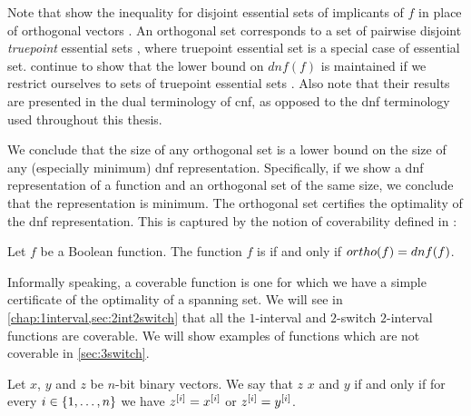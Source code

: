 Note that \citeauthor{Cepek2012}
show the inequality
for disjoint essential sets of implicants of $f$
in place of orthogonal vectors
\citep[Theorem 2.8]{Cepek2012}. %
An orthogonal set corresponds
to a set of pairwise disjoint
\emph{truepoint} essential sets
\citep[Section 3]{Cepek2012}, %
where truepoint essential set
is a special case of essential set.
\citeauthor{Cepek2012} continue to
show that the lower bound on $dnf(f)$ is maintained
if we restrict ourselves
to sets of truepoint essential sets
\citep[Corollary 3.2]{Cepek2012}. %
Also note that their results are presented in the dual
terminology of \acrfull{cnf},
as opposed to the \acrshort{dnf} terminology
used throughout this thesis.

We conclude that the size of any orthogonal set
is a lower bound on the size of any
(especially minimum)
\acrshort{dnf} representation.
Specifically,
if we show a \acrshort{dnf} representation of a function
and an orthogonal set of the same size,
we conclude that the representation is minimum.
The orthogonal set certifies
the optimality of the \acrshort{dnf} representation.
This is captured by the notion of coverability
defined in \citet{Cepek2012}:
\begin{definition}
\label{def:coverable}
Let $f$ be a Boolean function.
The function $f$ is 
if and only if
$ortho (f) = dnf (f)$.
\end{definition}

Informally speaking,
a coverable function is one for which
we have a simple certificate of the
optimality of a spanning set.
We will see
in \cref{chap:1interval,sec:2int2switch}
that all the $1$-interval
and $2$-switch $2$-interval functions
are coverable.
We will show examples of functions which are not coverable
in \cref{sec:3switch}.

\begin{definition}
\label{def:separatingvector}
Let $x$, $y$ and $z$ be $n$-bit binary vectors.
We say that $z$  $x$ and $y$
if and only if
for every $i \in \{1, \ldots, n\}$
we have
$z^{[i]} = x^{[i]}$ or $z^{[i]} = y^{[i]}$.
\end{definition}

